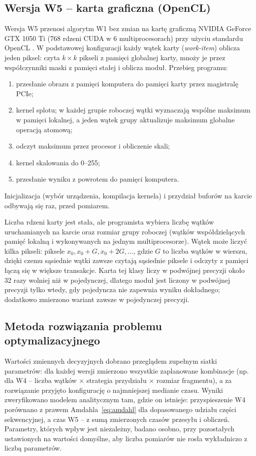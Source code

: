 \documentclass[12pt,a4paper]{article}
\begin{document}
\subsection{Wersja W5 -- karta graficzna (OpenCL)}

Wersja W5 przenosi algorytm W1 bez zmian na kartę graficzną NVIDIA GeForce GTX 1050 Ti (768 rdzeni CUDA w 6 multiprocesorach) przy użyciu standardu OpenCL \cite{opencl}. W podstawowej konfiguracji każdy wątek karty (\emph{work-item}) oblicza jeden piksel: czyta $k \times k$ pikseli z pamięci globalnej karty, mnoży je przez współczynniki maski z pamięci stałej i oblicza moduł. Przebieg programu:
\begin{enumerate}
	\item przesłanie obrazu z pamięci komputera do pamięci karty przez magistralę PCIe;
	\item kernel splotu; w każdej grupie roboczej wątki wyznaczają wspólne maksimum w pamięci lokalnej, a jeden wątek grupy aktualizuje maksimum globalne operacją atomową;
	\item odczyt maksimum przez procesor i obliczenie skali;
	\item kernel skalowania do 0--255;
	\item przesłanie wyniku z powrotem do pamięci komputera.
\end{enumerate}
Inicjalizacja (wybór urządzenia, kompilacja kernela) i przydział buforów na karcie odbywają się raz, przed pomiarem.

Liczba rdzeni karty jest stała, ale programista wybiera liczbę wątków uruchamianych na karcie oraz rozmiar grupy roboczej (wątków współdzielących pamięć lokalną i wykonywanych na jednym multiprocesorze). Wątek może liczyć kilka pikseli: piksele $x_0, x_0 + G, x_0 + 2G, \ldots$, gdzie $G$ to liczba wątków w wierszu, dzięki czemu sąsiednie wątki zawsze czytają sąsiednie piksele i odczyty z pamięci łączą się w większe transakcje. Karta tej klasy liczy w podwójnej precyzji około 32 razy wolniej niż w pojedynczej, dlatego moduł jest liczony w podwójnej precyzji tylko wtedy, gdy pojedyncza nie zapewnia wyniku dokładnego; dodatkowo zmierzono wariant zawsze w pojedynczej precyzji.

\subsection{Metoda rozwiązania problemu optymalizacyjnego}

Wartości zmiennych decyzyjnych dobrano przeglądem zupełnym siatki parametrów: dla każdej wersji zmierzono wszystkie zaplanowane kombinacje (np. dla W4 -- liczba wątków $\times$ strategia przydziału $\times$ rozmiar fragmentu), a za rozwiązanie przyjęto konfigurację o najmniejszej medianie czasu. Wyniki zweryfikowano modelem analitycznym tam, gdzie on istnieje: przyspieszenie W4 porównano z prawem Amdahla~\eqref{eq:amdahl} dla dopasowanego udziału części sekwencyjnej, a czas W5 -- z sumą zmierzonych czasów przesyłu i obliczeń. Parametry, których wpływ jest niezależny, badano osobno, przy pozostałych ustawionych na wartości domyślne, aby liczba pomiarów nie rosła wykładniczo z liczbą parametrów.
\end{document}

